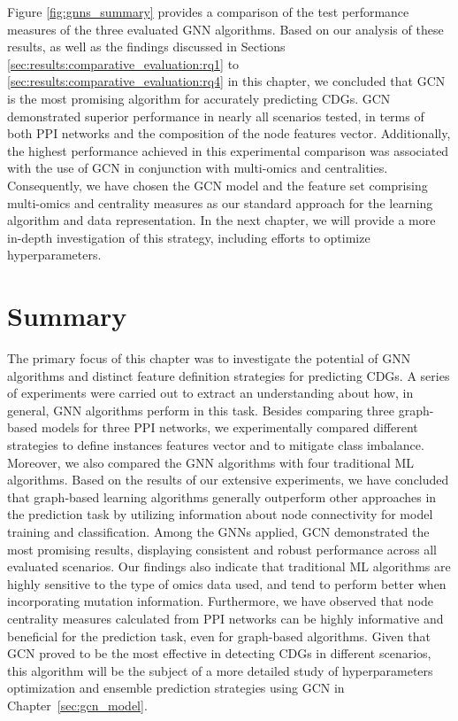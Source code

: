 Figure \ref{fig:gnns_summary} provides a comparison of the test performance measures of the three evaluated GNN algorithms. Based on our analysis of these results, as well as the findings discussed in Sections \ref{sec:results:comparative_evaluation:rq1} to \ref{sec:results:comparative_evaluation:rq4} in this chapter, we concluded that GCN is the most promising algorithm for accurately predicting CDGs. GCN demonstrated superior performance in nearly all scenarios tested, in terms of both PPI networks and the composition of the node features vector. Additionally, the highest performance achieved in this experimental comparison was associated with the use of GCN in conjunction with multi-omics and centralities. Consequently, we have chosen the GCN model and the feature set comprising multi-omics and centrality measures as our standard approach for the learning algorithm and data representation. In the next chapter, we will provide a more in-depth investigation of this strategy, including efforts to optimize hyperparameters.




\section{Summary}

The primary focus of this chapter was to investigate the potential of GNN algorithms and distinct feature definition strategies for predicting CDGs.
A series of experiments were carried out to extract an understanding about how, in general, GNN algorithms perform in this task. Besides comparing three graph-based models for three PPI networks, we experimentally compared different strategies to define instances features vector and to mitigate class imbalance. Moreover, we also compared the GNN algorithms with four traditional ML algorithms. Based on the results of our extensive experiments, we have concluded that graph-based learning algorithms generally outperform other approaches in the prediction task by utilizing information about node connectivity for model training and classification. Among the GNNs applied, GCN demonstrated the most promising results, displaying consistent and robust performance across all evaluated scenarios. Our findings also indicate that traditional ML algorithms are highly sensitive to the type of omics data used, and tend to perform better when incorporating mutation information. Furthermore, we have observed that node centrality measures calculated from PPI networks can be highly informative and beneficial for the prediction task, even for graph-based algorithms. Given that GCN proved to be the most effective in detecting CDGs in different scenarios, this algorithm will be the subject of a more detailed study of hyperparameters optimization and ensemble prediction strategies using GCN in Chapter~\ref{sec:gcn_model}.

